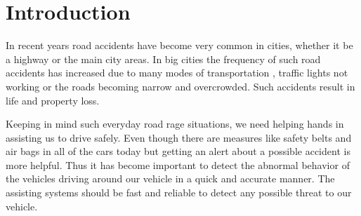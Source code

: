 \chapter{Introduction}




In recent years road accidents have become very common in cities, whether it be a highway or the main city areas. In big cities the frequency of such road accidents has increased due to many modes of transportation , traffic lights not working or the roads becoming narrow and overcrowded. Such accidents result in life and property loss.  

Keeping in mind such everyday road rage situations, we need helping hands in assisting us to drive safely. Even though there are measures like safety belts and air bags in all of the cars today but getting an alert about a possible accident is more helpful. Thus it has become important to detect the abnormal behavior of the vehicles driving around our vehicle in a quick and accurate manner. The assisting systems should be fast and reliable to detect any possible threat to our vehicle.

